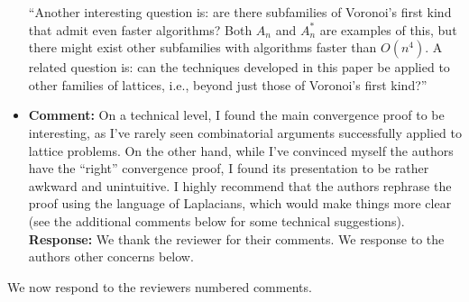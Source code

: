 \documentclass[a4paper,10pt]{article}
\begin{document}
\begin{itemize}
``Another interesting question is: are there subfamilies of Voronoi's first kind that admit even faster algorithms?  Both $A_n$ and $A_n^*$ are examples of this, but there might exist other subfamilies with algorithms faster than $O(n^4)$.  A related question is: can the techniques developed in this paper be applied to other families of lattices, i.e., beyond just those of Voronoi's first kind?''


\item\textbf{Comment:} 
On a technical level, I found the main convergence proof to be interesting, as I've rarely seen
combinatorial arguments successfully applied to lattice problems. On the other hand, while I've
convinced myself the authors have the ``right'' convergence proof, I found its presentation to be
rather awkward and unintuitive. I highly recommend that the authors rephrase the proof using
the language of Laplacians, which would make things more clear (see the additional comments
below for some technical suggestions).
\\\textbf{Response:}
We thank the reviewer for their comments.  We response to the authors other concerns below.

\end{itemize}

We now respond to the reviewers numbered comments.
\end{document}
